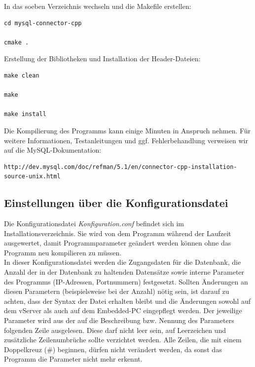 \documentclass[fontsize = 12pt, paper = a4]{scrreprt}
\begin{document}
\newpage


In das soeben Verzeichnis wechseln und die Makefile erstellen:

\vspace*{4mm}
\begin{lstlisting}[frame=single]
cd mysql-connector-cpp

cmake . 
\end{lstlisting} 
\vspace*{-2mm}
  

Erstellung der Bibliotheken und Installation der Header-Dateien: 

\vspace*{4mm}
\begin{lstlisting}[frame=single]
make clean 

make 

make install  
\end{lstlisting} 
\vspace*{-2mm}
  

Die Kompilierung des Programms kann einige Minuten in Anspruch nehmen. Für weitere Informationen, Testanleitungen und ggf. Fehlerbehandlung verweisen wir auf die MySQL-Dokumentation: 

\vspace*{4mm}
\begin{lstlisting}[frame=single]
 http://dev.mysql.com/doc/refman/5.1/en/connector-cpp-installation-source-unix.html
 \end{lstlisting} 
\vspace*{-2mm}
 
 \subsection{Einstellungen über die Konfigurationsdatei}
Die Konfigurationsdatei \textit{Konfiguration.conf} befindet sich im Installationsverzeichnis. Sie wird von dem Programm während der Laufzeit ausgewertet, damit Programmparameter geändert werden können ohne das Programm neu kompilieren zu müssen.\\ 

In dieser Konfigurationsdatei werden die Zugangsdaten für die Datenbank, die Anzahl der in der Datenbank zu haltenden Datensätze sowie interne Parameter des Programms (IP-Adressen, Portnummern) festgesetzt.
Sollten Änderungen an diesen Parametern (beispielsweise bei der Anzahl) nötig sein, ist darauf zu achten, dass der Syntax der Datei erhalten bleibt und die Änderungen sowohl auf dem vServer als auch auf dem Embedded-PC eingepflegt werden.
Der jeweilige Parameter wird aus der auf die Beschreibung bzw. Nennung des Parameters folgenden Zeile ausgelesen. 
Diese darf nicht leer sein, auf Leerzeichen und zusätzliche Zeilenumbrüche sollte verzichtet werden.
Alle Zeilen, die mit einem Doppelkreuz (\#) beginnen, dürfen nicht verändert werden, da sonst das Programm die Parameter nicht mehr erkennt. \\
\end{document}
